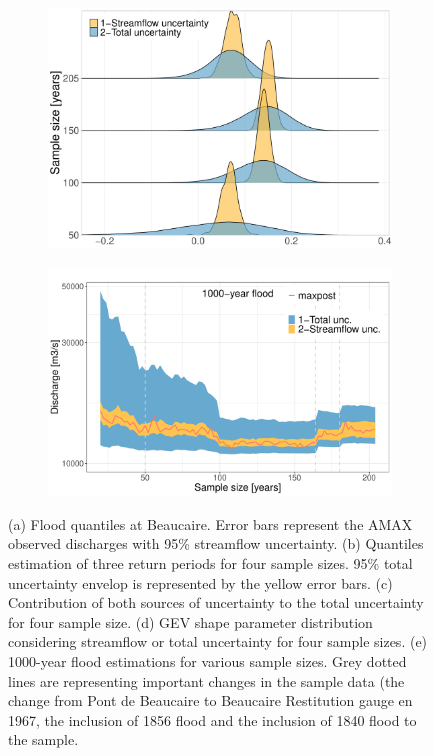 \documentclass[11pt]{article}
\begin{document}
\begin{figure}[p]
            \begin{subfigure}{0.47\textwidth}
                \centering
                \includegraphics[width=\linewidth]{Figs/11c-Shape_4cases.pdf}
                \caption{}
                \label{subfig:Form4cases}
            \end{subfigure}
            \begin{subfigure}{0.52\textwidth}
                \centering
                \includegraphics[width=\linewidth]{Figs/11d-Q1000SSize.pdf}
                \caption{}
                \label{subfig:SamplesQ1000}
            \end{subfigure}
            
            
        \caption{(a) Flood quantiles at Beaucaire. Error bars represent the AMAX observed discharges with 95\% streamflow uncertainty.
        (b) Quantiles estimation of three return periods for four sample sizes. 95\% total uncertainty envelop is represented by the yellow error bars. 
        (c) Contribution of both sources of uncertainty to the total uncertainty for four sample size. 
        (d) GEV shape parameter distribution considering streamflow or total uncertainty for four sample sizes. (e) 1000-year flood estimations for various sample sizes. Grey dotted lines are representing important changes in the sample data (the change from Pont de Beaucaire to Beaucaire Restitution gauge en 1967, the inclusion of 1856 flood and the inclusion of 1840 flood to the sample.}
        \label{fig:Quantiles}
        \end{figure}
\end{document}
